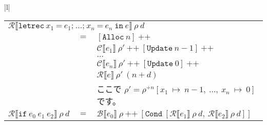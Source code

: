 \documentclass{jarticle}
\begin{document}
\begin{tabular} {|l|}
\begin{tabular}{r c l}
		\multicolumn{3}{l}{$\mathcal{R} \llbracket \texttt{letrec} ~ x_1 ~ \texttt{=} ~ e_1\texttt{;} ~  \ldots \texttt{;} ~ x_n ~ \texttt{=} ~ e_n ~ \texttt{in} ~ e \rrbracket ~ \rho ~ d$}                                                                                                                        \\
		                                                                                      & $=$ & $\left[\texttt{Alloc} ~ n\right] ~ \texttt{++}$                                                                                                                                                                \\
		                                                                                      &     & $\mathcal{C} \llbracket e_1 \rrbracket ~ \rho' ~ \texttt{++} ~ \left[\texttt{Update} ~ n - 1\right] ~ \texttt{++}$                                                                                             \\
		                                                                                      &     & $\ldots$                                                                                                                                                                                                       \\
		                                                                                      &     & $\mathcal{C} \llbracket e_n \rrbracket ~ \rho' ~ \texttt{++} ~ \left[\texttt{Update} ~ 0\right] ~ \texttt{++}$                                                                                                 \\
		                                                                                      &     & $\mathcal{R} \llbracket e \rrbracket ~ \rho' ~ (n + d)$                                                                                                                                                        \\
		                                                                                      &     & ここで $\rho' = \rho^{+n} \left[x_1 ~ \mapsto ~ n - 1, ~ \ldots , ~ x_n ~ \mapsto ~ 0\right]$ です。                                                                                                           \\
		$\mathcal{R} \llbracket \texttt{if} ~ e_0 ~ e_1 ~ e_2 \rrbracket ~ \rho ~ d$          & $=$ & $\mathcal{B} \llbracket e_0 \rrbracket ~ \rho ~ \texttt{++} ~ \left[\texttt{Cond} ~ \left[\mathcal{R} \llbracket e_1 \rrbracket ~ \rho ~ d, ~ \mathcal{R} \llbracket e_2 \rrbracket ~ \rho ~ d\right] \right]$ \\

\end{tabular}
\end{tabular}
\end{document}
